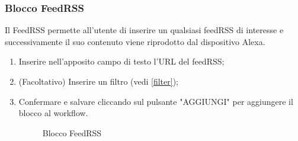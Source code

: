 \subsubsection{Blocco FeedRSS}
Il FeedRSS permette all'utente di inserire un qualsiasi feedRSS di interesse e successivamente il suo contenuto viene riprodotto dal dispositivo Alexa.
\begin{enumerate}
	\item Inserire nell'apposito campo di testo l'URL del feedRSS;
	\item (Facoltativo) Inserire un filtro (vedi \ref{filter});
	\item Confermare e salvare cliccando sul pulsante "AGGIUNGI" per aggiungere il blocco al workflow.
	\begin{figure}[!ht]
		\centering
		\caption{Blocco FeedRSS}
	\end{figure}
\end{enumerate}
\newpage
